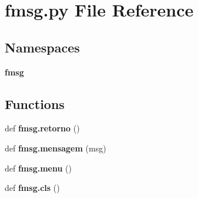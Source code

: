 \section{fmsg.\+py File Reference}
\label{fmsg_8py}
\subsection*{Namespaces}
\begin{DoxyCompactItemize}
\item 
 \textbf{ fmsg}
\end{DoxyCompactItemize}
\subsection*{Functions}
\begin{DoxyCompactItemize}
\item 
def \textbf{ fmsg.\+retorno} ()
\item 
def \textbf{ fmsg.\+mensagem} (msg)
\item 
def \textbf{ fmsg.\+menu} ()
\item 
def \textbf{ fmsg.\+cls} ()
\end{DoxyCompactItemize}
